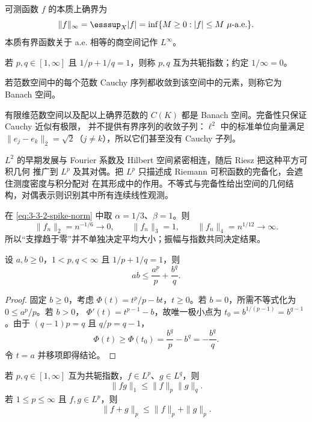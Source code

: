 \begin{definition}[$L^\infty$]\label{def:3-3-2-2}
可测函数 $f$ 的本质上确界为
\[
 \|f\|_\infty
 =\esssup_X|f|
 =\inf\{M\ge0:|f|\le M\ \mu\text{-a.e.}\}.
\]
本质有界函数关于 a.e. 相等的商空间记作 $L^\infty$。
\end{definition}

\begin{definition}[共轭指数]\label{def:3-3-2-3}
若 $p,q\in[1,\infty]$ 且 $1/p+1/q=1$，则称 $p,q$ 互为共轭指数；约定
$1/\infty=0$。
\end{definition}

\begin{definition}[Banach 空间]\label{def:3-3-2-banach}
若范数空间中的每个范数 Cauchy 序列都收敛到该空间中的元素，则称它为 Banach 空间。
\end{definition}

有限维范数空间以及配以上确界范数的 $C(K)$ 都是 Banach 空间。完备性只保证 Cauchy 近似有极限，
并不提供有界序列的收敛子列：$\ell^2$ 中的标准单位向量满足
$\|e_j-e_k\|_2=\sqrt2$（$j\ne k$），所以它们甚至没有 Cauchy 子列。

$L^2$ 的早期发展与 Fourier 系数及 Hilbert 空间紧密相连，随后 Riesz 把这种平方可积几何
推广到 $L^p$ 及其对偶。把 $L^p$ 只描述成 Riemann 可积函数的完备化，会遮住测度密度与积分配对
在其形成中的作用。不等式与完备性给出空间的几何结构，对偶表示则识别其中所有连续线性观测。

\begin{example}\label{ex:3-3-2-1}
在 \eqref{eq:3-3-2-spike-norm} 中取 $\alpha=1/3$、$\beta=1$。则
\[
 \|f_n\|_2=n^{-1/6}\longrightarrow0,
 \qquad
 \|f_n\|_3=1,
 \qquad
 \|f_n\|_4=n^{1/12}\longrightarrow\infty.
\]
所以“支撑趋于零”并不单独决定平均大小；振幅与指数共同决定结果。
\end{example}

\begin{lemma}\label{lemma:3-3-2-1}
设 $a,b\ge0$，$1<p,q<\infty$ 且 $1/p+1/q=1$，则
\[
  ab\le\frac{a^p}{p}+\frac{b^q}{q}.
\]
\end{lemma}

\begin{proof}
固定 $b\ge0$，考虑 $\Phi(t)=t^p/p-bt$，$t\ge0$。若 $b=0$，所需不等式化为
$0\le a^p/p$。若 $b>0$，
$\Phi'(t)=t^{p-1}-b$，故唯一极小点为
$t_0=b^{1/(p-1)}=b^{q-1}$。由于 $(q-1)p=q$ 且 $q/p=q-1$，
\[
 \Phi(t)\ge\Phi(t_0)
 =\frac{b^q}{p}-b^q=-\frac{b^q}{q}.
\]
令 $t=a$ 并移项即得结论。
\end{proof}

\begin{theorem}\label{theorem:3-3-2-2}
若 $p,q\in[1,\infty]$ 互为共轭指数，$f\in L^p$、$g\in L^q$，则
\[
  \|fg\|_1\le\|f\|_p\|g\|_q.
  \tag{H}\label{eq:3-3-2-holder}
\]
若 $1\le p\le\infty$ 且 $f,g\in L^p$，则
\[
  \|f+g\|_p\le\|f\|_p+\|g\|_p.
  \tag{M}\label{eq:3-3-2-minkowski}
\]
\end{theorem}

